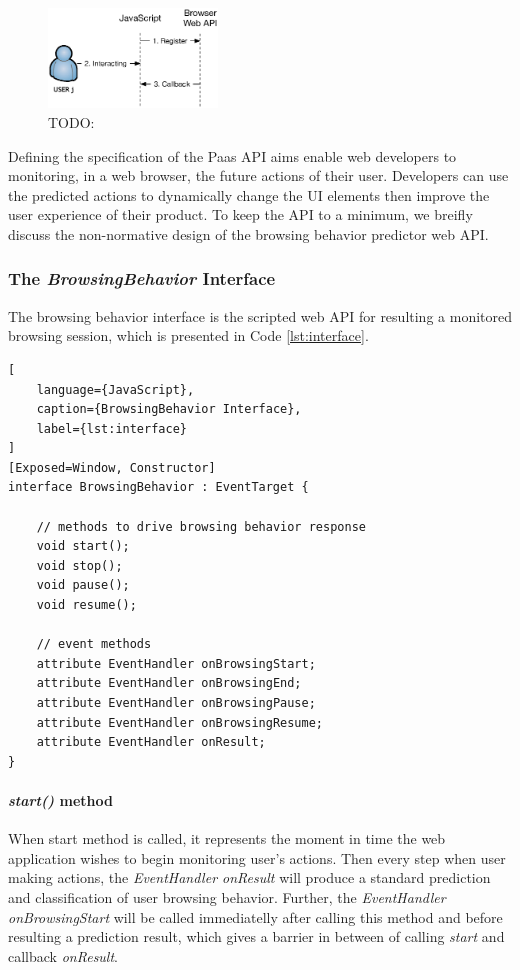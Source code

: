 \begin{figure}[H]
    \centering
    \includegraphics[width=0.4\textwidth]{figures/webapi}
    \caption{TODO:}
    \label{fig:webapi}
\end{figure}

Defining the specification of the Paas API aims enable web developers to
monitoring, in a web browser, the future actions of their user.
Developers can use the predicted actions to dynamically change the UI elements then improve
the user experience of their product. To keep the API to a minimum, we breifly discuss the
non-normative design of the browsing behavior predictor web API.

\subsubsection{The \emph{BrowsingBehavior} Interface}

The browsing behavior interface is the scripted web API for resulting a monitored browsing
session, which is presented in Code \ref{lst:interface}.

\begin{lstlisting}[
    language={JavaScript},
    caption={BrowsingBehavior Interface},
    label={lst:interface}
]
[Exposed=Window, Constructor]
interface BrowsingBehavior : EventTarget {
    
    // methods to drive browsing behavior response
    void start();
    void stop();
    void pause();
    void resume();

    // event methods
    attribute EventHandler onBrowsingStart;
    attribute EventHandler onBrowsingEnd;
    attribute EventHandler onBrowsingPause;
    attribute EventHandler onBrowsingResume;
    attribute EventHandler onResult;
}
\end{lstlisting}

\paragraph{\emph{start()} method} When start method is called, it represents the moment in
time the web application wishes to begin monitoring user's actions.
Then every step when user making actions, the \emph{EventHandler onResult} will produce
a standard prediction and classification of user browsing behavior. Further, 
the \emph{EventHandler onBrowsingStart} will be called immediatelly after calling 
this method and before resulting a prediction result, which gives a barrier in between of
calling \emph{start} and callback \emph{onResult}.

